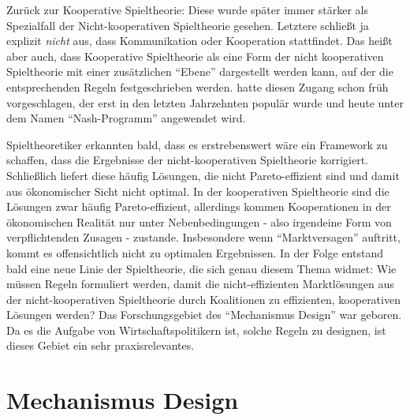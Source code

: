 Zurück zur Kooperative Spieltheorie: Diese wurde später immer stärker als Spezialfall der Nicht-kooperativen Spieltheorie gesehen. Letztere schließt ja explizit \textit{nicht} aus, dass Kommunikation oder Kooperation stattfindet. Das heißt aber auch, dass Kooperative Spieltheorie als eine Form der nicht kooperativen Spieltheorie mit einer zusätzlichen "`Ebene"' dargestellt werden kann, auf der die entsprechenden Regeln festgeschrieben werden. \textcite{Nash1953} hatte diesen Zugang schon früh vorgeschlagen, der erst in den letzten Jahrzehnten populär wurde und heute unter dem Namen "`Nash-Programm"' angewendet wird.

Spieltheoretiker erkannten bald, dass es erstrebenswert wäre ein Framework zu schaffen, dass die Ergebnisse der nicht-kooperativen Spieltheorie korrigiert. Schließlich liefert diese häufig Lösungen, die nicht Pareto-effizient sind und damit aus ökonomischer Sicht nicht optimal. In der kooperativen Spieltheorie sind die Lösungen zwar häufig Pareto-effizient, allerdings kommen Kooperationen in der ökonomischen Realität nur unter Nebenbedingungen - also irgendeine Form von verpflichtenden Zusagen -  zustande. Insbesondere wenn "`Marktversagen"' auftritt, kommt es offensichtlich nicht zu optimalen Ergebnissen. In der Folge entstand bald eine neue Linie der Spieltheorie, die sich genau diesem Thema widmet: Wie müssen Regeln formuliert werden, damit die nicht-effizienten Marktlösungen aus der nicht-kooperativen Spieltheorie durch Koalitionen zu effizienten, kooperativen Lösungen werden? Das Forschungsgebiet des "`Mechanismus Design"' war geboren. Da es die Aufgabe von Wirtschaftspolitikern ist, solche Regeln zu designen, ist dieses Gebiet ein sehr praxisrelevantes.


\section{Mechanismus Design}

